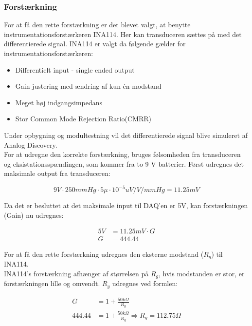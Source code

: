 \subsubsection{Forstærkning}
For at få den rette forstærkning er det blevet valgt, at benytte instrumentationsforstærkeren INA114. Her kan transduceren sættes på med det differentierede signal. INA114 er valgt da følgende gælder\cite{Instrumentation} for instrumentationsforstærkeren: 
\begin{itemize}
	\item Differentielt input - single ended output 
	\item Gain justering med ændring af kun én modstand 
	\item Meget høj indgangsimpedans 
	\item Stor Common Mode Rejection Ratio(CMRR)
\end{itemize}
Under opbygning og modultestning vil det differentierede signal blive simuleret af Analog Discovery. \\
For at udregne den korrekte forstærkning, bruges følsomheden fra transduceren og eksistationsspændingen, som kommer fra to 9 V batterier.
Først udregnes det maksimale output fra transduceren: 
\begin{ceqn}  
\begin{equation}
9V\cdot 250mmHg \cdot 5\mu\cdot 10^{-5} uV/V/mmHg  = 11.25mV
\end{equation}
\end{ceqn}
Da det er besluttet at det maksimale input til DAQ'en \cite{DSB} er 5V, kan forstærkningen (Gain) nu udregnes:
\begin{ceqn}
\begin{equation}
\begin{split}
5V& =11.25mV\cdot G\\   
G& =444.44
\end{split}
\end{equation}
\end{ceqn}
\cite{INA} For at få den rette forstærkning udregnes den eksterne modstand ($ R_g $) til INA114.\\ 
INA114's forstærkning afhænger af størrelsen på $ R_g $, hvis modstanden er stor, er forstærkningen lille og omvendt.  $ R_g $ udregnes ved formlen:
\begin{ceqn}
\begin{equation}
\begin{split}
G&=1+\frac{50k\Omega}{R_g}\\
444.44&= 1+\frac{50k\Omega}{R_g} \Rightarrow R_g= 112.75 \Omega
\end{split}
\end{equation}
\end{ceqn}
